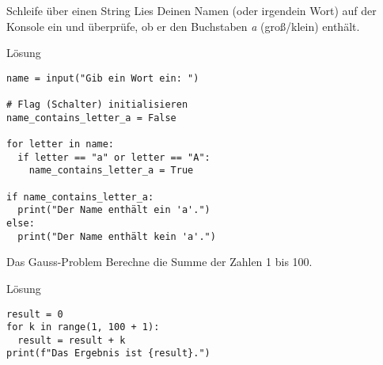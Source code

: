 \begin{fragile}[Übung]
\begin{block}{Schleife über einen String}
\vspace{2pt}
Lies Deinen Namen (oder irgendein Wort) auf der Konsole ein und überprüfe, ob er den Buchstaben \emph{a} (groß/klein) enthält. 
\end{block}
\vspace{12pt}
\begin{solutionblock}{Lösung}
\begin{verbatim}
name = input("Gib ein Wort ein: ")

# Flag (Schalter) initialisieren
name_contains_letter_a = False

for letter in name:
  if letter == "a" or letter == "A":
    name_contains_letter_a = True

if name_contains_letter_a:
  print("Der Name enthält ein 'a'.")
else:
  print("Der Name enthält kein 'a'.")
\end{verbatim}
\end{solutionblock}


\end{fragile}




\begin{fragile}

\begin{block}{Das Gauss-Problem}
\vspace{2pt}	
Berechne die Summe der Zahlen 1 bis 100. 
\end{block}
\vspace{12pt}
\begin{solutionblock}{Lösung}
\begin{verbatim}
result = 0
for k in range(1, 100 + 1):
  result = result + k
print(f"Das Ergebnis ist {result}.")
\end{verbatim}
\end{solutionblock}



\end{fragile}

